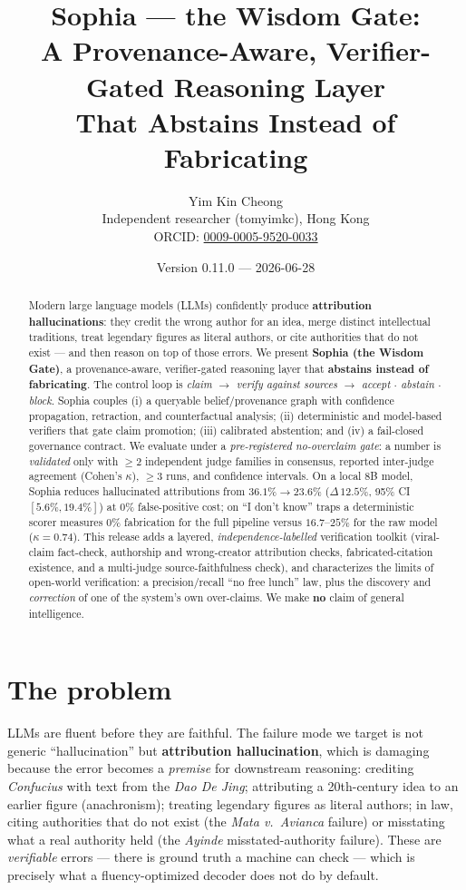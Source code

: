 \documentclass[11pt]{article}
\title{Sophia --- the Wisdom Gate:\\
A Provenance-Aware, Verifier-Gated Reasoning Layer\\
That Abstains Instead of Fabricating}
\author{Yim Kin Cheong\\
\small Independent researcher (tomyimkc), Hong Kong\\
\small ORCID: \href{https://orcid.org/0009-0005-9520-0033}{0009-0005-9520-0033}}
\date{Version 0.11.0 --- 2026-06-28}
\begin{document}
\maketitle

\begin{abstract}
Modern large language models (LLMs) confidently produce \textbf{attribution hallucinations}:
they credit the wrong author for an idea, merge distinct intellectual traditions, treat
legendary figures as literal authors, or cite authorities that do not exist --- and then reason
on top of those errors. We present \textbf{Sophia (the Wisdom Gate)}, a provenance-aware,
verifier-gated reasoning layer that \textbf{abstains instead of fabricating}. The control loop is
\emph{claim $\rightarrow$ verify against sources $\rightarrow$ accept $\cdot$ abstain $\cdot$
block}. Sophia couples (i) a queryable belief/provenance graph with confidence propagation,
retraction, and counterfactual analysis; (ii) deterministic and model-based verifiers that gate
claim promotion; (iii) calibrated abstention; and (iv) a fail-closed governance contract. We
evaluate under a \emph{pre-registered no-overclaim gate}: a number is \emph{validated} only with
$\ge 2$ independent judge families in consensus, reported inter-judge agreement (Cohen's
$\kappa$), $\ge 3$ runs, and confidence intervals. On a local 8B model, Sophia reduces
hallucinated attributions from $36.1\% \rightarrow 23.6\%$ ($\Delta\,12.5\%$, 95\% CI
$[5.6\%, 19.4\%]$) at $0\%$ false-positive cost; on ``I don't know'' traps a deterministic scorer
measures $0\%$ fabrication for the full pipeline versus $16.7$--$25\%$ for the raw model
($\kappa = 0.74$). This release adds a layered, \emph{independence-labelled} verification toolkit
(viral-claim fact-check, authorship and wrong-creator attribution checks, fabricated-citation
existence, and a multi-judge source-faithfulness check), and characterizes the limits of
open-world verification: a precision/recall ``no free lunch'' law, plus the discovery and
\emph{correction} of one of the system's own over-claims. We make \textbf{no} claim of general
intelligence.
\end{abstract}

\section{The problem}
LLMs are fluent before they are faithful. The failure mode we target is not generic
``hallucination'' but \textbf{attribution hallucination}, which is damaging because the error
becomes a \emph{premise} for downstream reasoning: crediting \emph{Confucius} with text from the
\emph{Dao De Jing}; attributing a 20th-century idea to an earlier figure (anachronism); treating
legendary figures as literal authors; in law, citing authorities that do not exist (the
\emph{Mata v.\ Avianca} failure) or misstating what a real authority held (the \emph{Ayinde}
misstated-authority failure). These are \emph{verifiable} errors --- there is ground truth a
machine can check --- which is precisely what a fluency-optimized decoder does not do by default.
\end{document}
